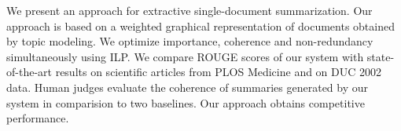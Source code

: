 We present an approach for extractive single-document summarization. Our approach is based on a weighted graphical representation of documents obtained by topic modeling. We optimize importance, coherence and non-redundancy simultaneously using ILP. We compare ROUGE scores of our system with state-of-the-art results on scientific articles from PLOS Medicine and on DUC 2002 data. Human judges evaluate the coherence of summaries generated by our system in comparision to two baselines. Our approach obtains competitive performance.
